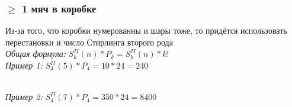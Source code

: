 \documentclass{article}
\begin{document}
            \subsubsection{$\ge$ 1 мяч в коробке}
                Из-за того, что коробки нумерованны и шары тоже, то придётся использовать перестановки и число Стирлинга второго рода\\
                \textit{Общая формула:} $ S^{II}_{k}(n) * P_k = S^{II}_{k}(n) * k! $\\
                \textit{Пример 1:} $ S^{II}_{4}(5) * P_4  = 10*24 = 240 $
                \begin{figure}[h!]
                \end{figure}\\
                \textit{Пример 2:} $ S^{II}_{4}(7) * P_4  = 350*24 = 8400 $
                \begin{figure}[h!]
                \end{figure}
\end{document}
